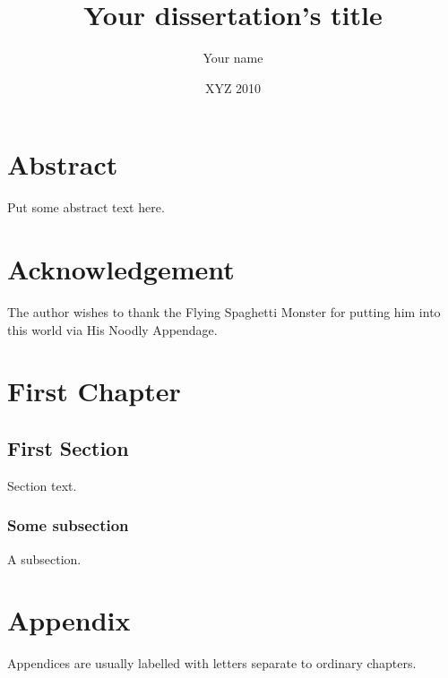 \documentclass[10pt,oneside]{book}
\begin{document}
\title{Your dissertation's title}
\author{Your name}
\date{XYZ 2010}
\maketitle 
\frontmatter

\chapter{Abstract}

Put some abstract text here.

\tableofcontents



\listoffigures





\chapter{Acknowledgement}

The author wishes to thank the Flying Spaghetti Monster for putting him into this world via His Noodly Appendage.


\printglossary



\mainmatter

\chapter{First Chapter}
\section{First Section}

Section text.

\subsection{Some subsection}

A subsection.



\appendix
\chapter{Appendix}
Appendices are usually labelled with letters separate to ordinary chapters.


\singlespacing


\printindex
{}
\end{document}
